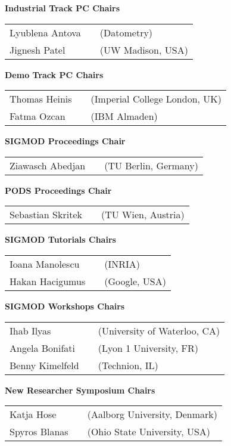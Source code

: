 {\vfill
\textbf{Industrial Track PC Chairs}

\begin{tabular}{lp{.5em}l}
Lyublena Antova	&& \textsf{\small(Datometry)}	\\
Jignesh Patel	&& \textsf{\small(UW Madison, USA)}
\end{tabular}

\vfill
\textbf{Demo Track PC Chairs}

\begin{tabular}{lp{.5em}l}
Thomas Heinis	&& \textsf{\small(Imperial College London, UK)}	\\
Fatma Ozcan	&& \textsf{\small(IBM Almaden)}
\end{tabular}

\vfill
\textbf{SIGMOD Proceedings Chair}

\begin{tabular}{lp{.5em}l}
Ziawasch Abedjan	&& \textsf{\small(TU Berlin, Germany)}
\end{tabular}

\vfill
\textbf{PODS Proceedings Chair}

\begin{tabular}{lp{.5em}l}
Sebastian Skritek	&& \textsf{\small(TU Wien, Austria)}
\end{tabular}

\vfill
\textbf{SIGMOD Tutorials Chairs}

\begin{tabular}{lp{.5em}l}
Ioana Manolescu	&& \textsf{\small(INRIA)}	\\
Hakan Hacigumus	&& \textsf{\small(Google, USA)}
\end{tabular}

\vfill
\textbf{SIGMOD Workshops Chairs}

\begin{tabular}{lp{.5em}l}
Ihab Ilyas	&& \textsf{\small(University of Waterloo, CA)}	\\
Angela Bonifati	&& \textsf{\small(Lyon 1 University, FR)}	\\
Benny Kimelfeld	&& \textsf{\small(Technion, IL)}
\end{tabular}

\vfill
\textbf{New Researcher Symposium Chairs}

\begin{tabular}{lp{.5em}l}
Katja Hose	&& \textsf{\small(Aalborg University, Denmark)}	\\
Spyros Blanas	&& \textsf{\small(Ohio State University, USA)}
\end{tabular}

}
